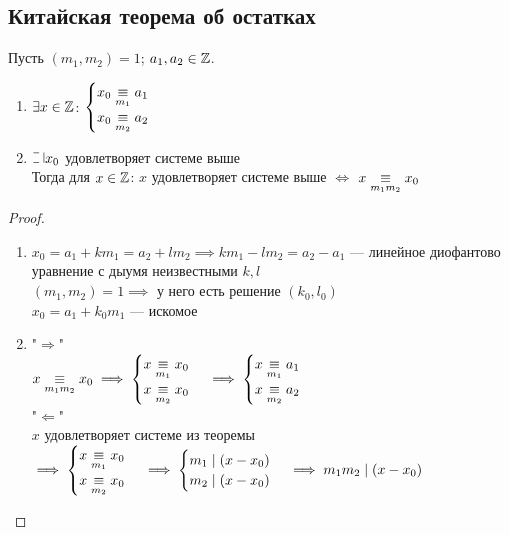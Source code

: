 \begin{normalsize}

\section{Китайская теорема об остатках}

\begin{theorem}
    Пусть $(m_1, m_2) = 1$; $a_1, a_2 \in \mathbb{Z}$.\\
    \begin{enumerate}
        \item $\exists x \in \mathbb{Z}$: 
        $\begin{cases}
            x_0 \underset{m_1}{\equiv} a_1 \\
            x_0 \underset{m_2}{\equiv} a_2
        \end{cases}$
        \item $\letus x_0$ удовлетворяет системе выше\\
        Тогда для $x \in \mathbb{Z}$: $x$ удовлетворяет системе выше $\iff$ $x \underset{m_1 m_2}{\equiv} x_0$
    \end{enumerate}
\end{theorem}

\begin{proof}
    \begin{enumerate}
        \item $x_0 = a_1 + km_1 = a_2 + lm_2 \implies km_1 - lm_2 = a_2 - a_1$ --- линейное диофантово уравнение с дыумя неизвестными $k, l$\\
        $(m_1, m_2) = 1 \implies$ у него есть решение $(k_0, l_0)$\\
        $x_0 = a_1 + k_0 m_1$ --- искомое

        \item 
        "$\Rightarrow$"\\
        $x \underset{m_1m_2}{\equiv} x_0 \implies 
        \begin {cases} 
            x \underset{m_1}{\equiv} x_0 \\
            x \underset{m_2}{\equiv} x_0
        \end{cases} \implies
        \begin{cases}
            x \underset{m_1}{\equiv} a_1 \\
            x \underset{m_2}{\equiv} a_2
        \end{cases}$\\
        "$\Leftarrow$"\\
        $x$ удовлетворяет системе из теоремы $\implies
        \begin {cases} 
            x \underset{m_1}{\equiv} x_0 \\
            x \underset{m_2}{\equiv} x_0
        \end{cases} \implies
        \begin{cases}
            m_1 \mid (x - x_0)\\
            m_2 \mid (x - x_0)
        \end{cases} \implies m_1m_2 \mid (x - x_0)$
    \end{enumerate}
\end{proof}


\end{normalsize}
